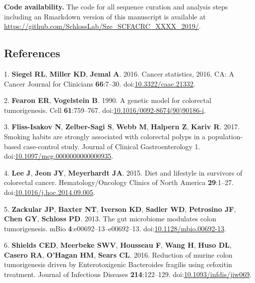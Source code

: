 \documentclass[11pt,]{article}
\begin{document}
\textbf{Code availability.} The code for all sequence curation and
analysis steps including an Rmarkdown version of this manuscript is
available at \url{https://github.com/SchlossLab/Sze_SCFACRC_XXXX_2019/}.

\newpage

\hypertarget{references}{%
\subsection{References}\label{references}}

\hypertarget{refs}{}
\leavevmode\hypertarget{ref-Siegel2016}{}%
1. \textbf{Siegel RL}, \textbf{Miller KD}, \textbf{Jemal A}. 2016.
Cancer statistics, 2016. CA: A Cancer Journal for Clinicians
\textbf{66}:7--30.
doi:\href{https://doi.org/10.3322/caac.21332}{10.3322/caac.21332}.

\leavevmode\hypertarget{ref-Fearon1990}{}%
2. \textbf{Fearon ER}, \textbf{Vogelstein B}. 1990. A genetic model for
colorectal tumorigenesis. Cell \textbf{61}:759--767.
doi:\href{https://doi.org/10.1016/0092-8674(90)90186-i}{10.1016/0092-8674(90)90186-i}.

\leavevmode\hypertarget{ref-FlissIsakov2017}{}%
3. \textbf{Fliss-Isakov N}, \textbf{Zelber-Sagi S}, \textbf{Webb M},
\textbf{Halpern Z}, \textbf{Kariv R}. 2017. Smoking habits are strongly
associated with colorectal polyps in a population-based case-control
study. Journal of Clinical Gastroenterology 1.
doi:\href{https://doi.org/10.1097/mcg.0000000000000935}{10.1097/mcg.0000000000000935}.

\leavevmode\hypertarget{ref-Lee2015}{}%
4. \textbf{Lee J}, \textbf{Jeon JY}, \textbf{Meyerhardt JA}. 2015. Diet
and lifestyle in survivors of colorectal cancer. Hematology/Oncology
Clinics of North America \textbf{29}:1--27.
doi:\href{https://doi.org/10.1016/j.hoc.2014.09.005}{10.1016/j.hoc.2014.09.005}.

\leavevmode\hypertarget{ref-Zackular2013}{}%
5. \textbf{Zackular JP}, \textbf{Baxter NT}, \textbf{Iverson KD},
\textbf{Sadler WD}, \textbf{Petrosino JF}, \textbf{Chen GY},
\textbf{Schloss PD}. 2013. The gut microbiome modulates colon
tumorigenesis. mBio \textbf{4}:e00692--13--e00692--13.
doi:\href{https://doi.org/10.1128/mbio.00692-13}{10.1128/mbio.00692-13}.

\leavevmode\hypertarget{ref-DeStefanoShields2016}{}%
6. \textbf{Shields CED}, \textbf{Meerbeke SWV}, \textbf{Housseau F},
\textbf{Wang H}, \textbf{Huso DL}, \textbf{Casero RA}, \textbf{O'Hagan
HM}, \textbf{Sears CL}. 2016. Reduction of murine colon tumorigenesis
driven by Enterotoxigenic Bacteroides fragilis using cefoxitin
treatment. Journal of Infectious Diseases \textbf{214}:122--129.
doi:\href{https://doi.org/10.1093/infdis/jiw069}{10.1093/infdis/jiw069}.
\end{document}
